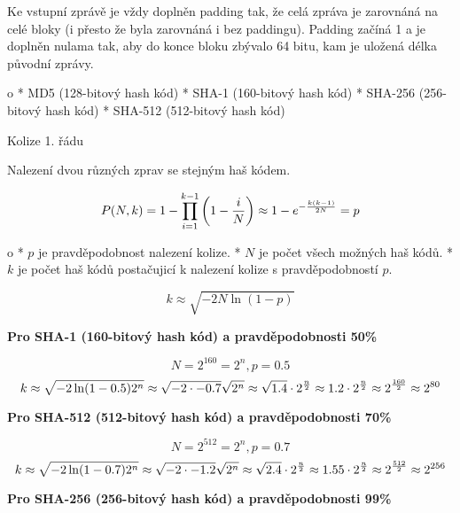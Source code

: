 Ke vstupní zprávě je vždy doplněn padding tak, že celá zpráva je zarovnáná na celé bloky (i přesto že byla zarovnáná i bez paddingu). Padding začíná 1 a je doplněn nulama tak, aby do konce bloku zbývalo 64 bitu, kam je uložená délka původní zprávy.

\begitems \style o
* MD5 (128-bitový hash kód)
* SHA-1 (160-bitový hash kód)
* SHA-256 (256-bitový hash kód)
* SHA-512 (512-bitový hash kód)
\enditems



\sec Kolize 1. řádu

Nalezení dvou různých zprav se stejným haš kódem.

$$
P(N,k) = 1 - \prod^{k-1}_{i=1}\left( 1 - {i \over N} \right)
\approx 1 - e^{-{k(k-1) \over 2N}}= p
$$

\begitems \style o
* $p$ je pravděpodobnost nalezení kolize.
* $N$ je počet všech možných haš kódů.
* $k$ je počet haš kódů postačujicí k nalezení kolize s pravděpodobností $p$.
\enditems

$$k \approx \sqrt{-2N\ln(1 - p)}$$

{\bf Pro SHA-1 (160-bitový hash kód) a pravděpodobnosti 50\%}

$$N = 2^{160} = 2^n, p = 0.5$$
$$
k \approx \sqrt{-2 \ln(1 - 0.5) 2^n} \approx \sqrt{-2 \cdot -0.7}\sqrt{2^n}
\approx \sqrt{1.4} \cdot 2^{n \over 2} \approx 1.2 \cdot 2^{n \over 2}
\approx 2^{160 \over 2} \approx 2^{80}
$$

{\bf Pro SHA-512 (512-bitový hash kód) a pravděpodobnosti 70\%}

$$N = 2^{512} = 2^n, p = 0.7$$
$$
k \approx \sqrt{-2 \ln(1 - 0.7) 2^n} \approx \sqrt{-2 \cdot -1.2}\sqrt{2^n}
\approx \sqrt{2.4} \cdot 2^{n \over 2} \approx 1.55 \cdot 2^{n \over 2}
\approx 2^{512 \over 2} \approx 2^{256}
$$

{\bf Pro SHA-256 (256-bitový hash kód) a pravděpodobnosti 99\%}

